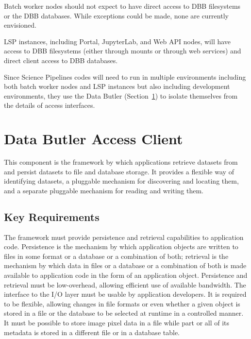 \documentclass[DM,toc]{lsstdoc}
\begin{document}
Batch worker nodes should not expect to have direct access to DBB filesystems or the DBB databases.
While exceptions could be made, none are currently envisioned.

LSP instances, including Portal, JupyterLab, and Web API nodes, will have access to DBB filesystems (either through mounts or through web services) and direct client access to DBB databases.

Since Science Pipelines codes will need to run in multiple environments including both batch worker nodes and LSP instances but also including development environments, they use the Data Butler (Section~\ref{data-butler-access-client}) to isolate themselves from the details of access interfaces.


\section{Data Butler Access Client}\label{data-butler-access-client}

This component is the framework by which applications retrieve datasets from
and persist datasets to file and database storage.  It provides a flexible way
of identifying datasets, a pluggable mechanism for discovering and locating
them, and a separate pluggable mechanism for reading and writing them.

\subsection{Key Requirements}\label{butler-requirements}

The framework must provide persistence and retrieval capabilities to
application code. Persistence is the mechanism by which application
objects are written to files in some format or a database or a
combination of both; retrieval is the mechanism by which data in files
or a database or a combination of both is made available to application
code in the form of an application object. Persistence and retrieval
must be low-overhead, allowing efficient use of available bandwidth. The
interface to the I/O layer must be usable by application developers. It
is required to be flexible, allowing changes in file formats or even
whether a given object is stored in a file or the database to be
selected at runtime in a controlled manner. It must be possible to store
image pixel data in a file while part or all of its metadata is stored
in a different file or in a database table.
\end{document}

